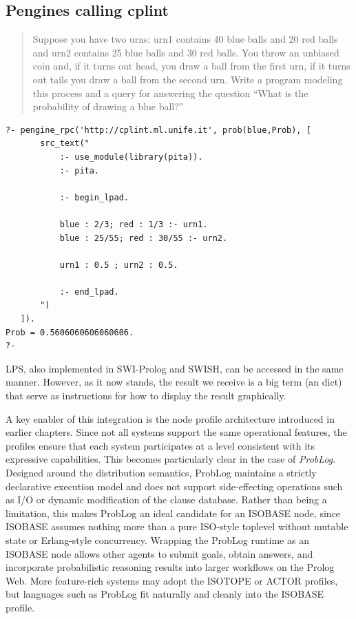 \subsection*{Pengines calling cplint}

\begin{quotation}
Suppose you have two urns: urn1 contains 40 blue balls and 20 red balls and urn2 contains 25 blue balls and 30 red balls. You throw an unbiased coin and, if it turns out head, you draw a ball from the first urn, if it turns out tails you draw a ball from the second urn. Write a program modeling this process and a query for answering the question ``What is the probability of drawing a blue ball?''
\end{quotation}

\begin{verbatim}
?- pengine_rpc('http://cplint.ml.unife.it', prob(blue,Prob), [
       src_text("
           :- use_module(library(pita)).
           :- pita.
        
           :- begin_lpad.
        
           blue : 2/3; red : 1/3 :- urn1.
           blue : 25/55; red : 30/55 :- urn2.
        
           urn1 : 0.5 ; urn2 : 0.5.
        
           :- end_lpad.
       ")
   ]).
Prob = 0.5606060606060606.
?-
\end{verbatim}

\noindent LPS, also implemented in SWI-Prolog and SWISH, can be accessed in the same manner. However, as it now stands, the result we receive is a big term (an dict) that serve as instructions for how to display the result graphically.

A key enabler of this integration is the node profile architecture introduced in earlier chapters. Since not all systems support the same operational features, the profiles ensure that each system participates at a level consistent with its expressive capabilities. This becomes particularly clear in the case of \textit{ProbLog}. Designed around the distribution semantics, ProbLog maintains a strictly declarative execution model and does not support side-effecting operations such as I/O or dynamic modification of the clause database. Rather than being a limitation, this makes ProbLog an ideal candidate for an \textsc{ISOBASE} node, since \textsc{ISOBASE} assumes nothing more than a pure ISO-style toplevel without mutable state or Erlang-style concurrency. Wrapping the ProbLog runtime as an \textsc{ISOBASE} node allows other agents to submit goals, obtain answers, and incorporate probabilistic reasoning results into larger workflows on the Prolog Web. More feature-rich systems may adopt the \textsc{ISOTOPE} or \textsc{ACTOR} profiles, but languages such as ProbLog fit naturally and cleanly into the \textsc{ISOBASE} profile.

